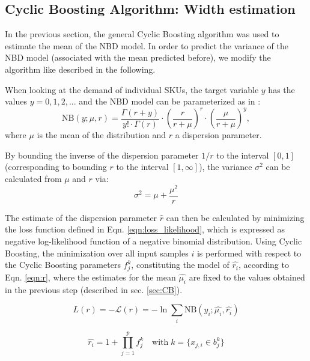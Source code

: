 \documentclass[BCOR=1mm, DIV=calc,10pt,
twoside=true,
twocolumn,
headings=normal]{scrartcl}
\newcommand{\eqn}{Eqn. }
\begin{document}
\subsection{Cyclic Boosting Algorithm: Width estimation}
\label{sec:cb_width}

In the previous section, the general Cyclic Boosting algorithm was used to estimate the mean of the NBD model. In order to predict the variance of the NBD model (associated with the mean predicted before), we modify the algorithm like described in the following.

When looking at the demand of individual SKUs, the target variable $y$ has the values $y = 0, 1, 2, ...$ and the NBD model can be parameterized as in \cite{hilbe2011negative}:
\begin{equation} \label{eqn:nbinom}
\mathrm{NB}(y; \mu, r) = \frac{\Gamma(r + y)}{y! \cdot \Gamma(r)} \cdot \left(\frac{r}{r + \mu}\right)^r \cdot \left(\frac{\mu}{r + \mu}\right)^y,
\end{equation}
where $\mu$ is the mean of the distribution and $r$ a dispersion parameter.

By bounding the inverse of the dispersion parameter $1/r$ to the interval $[0, 1]$ (corresponding to bounding $r$ to the interval $[1, \infty]$), the variance $\sigma^2$ can be calculated from $\mu$ and $r$ via:
\begin{equation} \label{eqn:variance_r}
\sigma^2 = \mu + \frac{\mu^2}{r}
\end{equation}

The estimate of the dispersion parameter $\hat{r}$ can then be calculated by minimizing the loss function defined in \eqn \eqref{eqn:loss_likelihood}, which is expressed as negative log-likelihood function of a negative binomial distribution. Using Cyclic Boosting, the minimization over all input samples $i$ is performed with respect to the Cyclic Boosting parameters $f^k_j$, constituting the model of $\hat{r_i}$, according to \eqn \eqref{eqn:r}, where the estimates for the mean $\hat{\mu_i}$ are fixed to the values obtained in the previous step (described in sec. \ref{sec:CB}).

\begin{equation} \label{eqn:loss_likelihood}
L(r) = -\mathcal{L}(r) = -\ln \sum_i \mathrm{NB}(y_i; \hat{\mu_i}, \hat{r_i})
\end{equation}

\begin{equation} \label{eqn:r}
\hat{r_i} = 1 + \prod \limits_{j=1}^p f^k_j \quad \text{with}\; k=\{ x_{j,i} \in b^k_j\}
\end{equation}
\end{document}
